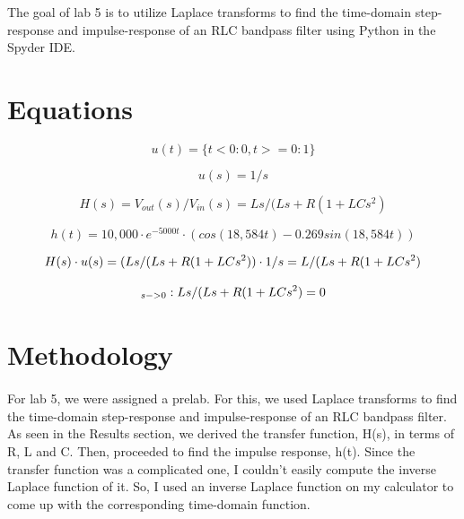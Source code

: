 \documentclass[12pt]{report}
\begin{document}
The goal of lab 5 is to utilize Laplace transforms to find the time-domain step-response and impulse-response of an RLC bandpass
filter using Python in the Spyder IDE.

\section{Equations}
    \begin{equation*}
        u(t) = \{t<0:0, t>=0:1\}
    \end{equation*}
 
    \begin{equation*}
        u(s) = 1/s
    \end{equation*}
 
    \begin{equation*}
        H(s) = V_{out}(s)/V_{in}(s) = Ls/(Ls + R(1 + LCs^2)
    \end{equation*}
    
     \begin{equation*}
        h(t) = 10,000 \cdot e^{-5000t} \cdot ( cos(18,584t) - 0.269sin(18,584t) )
    \end{equation*}
    
    \begin{equation*}
        H(s) \cdot u(s) = ( Ls/(Ls + R(1 + LCs^2) ) \cdot 1/s \\
                        = L/(Ls + R(1 + LCs^2)
    \end{equation*}

    \begin{equation*}
       [ H(s) \cdot u(s) ]_{s -> 0}: Ls/(Ls + R(1 + LCs^2) \\
                                = 0
    \end{equation*}
    
\section{Methodology}


    \paragraph{} For lab 5, we were assigned a prelab. For this, we used Laplace transforms to find the time-domain step-response and impulse-response of an RLC bandpass filter. As seen in the Results section, we derived the transfer function, H(s), in terms of R, L and C. Then, proceeded to find the impulse response, h(t). Since the transfer function was a complicated one, I couldn't easily compute the inverse Laplace function of it. So, I used an inverse Laplace function on my calculator to come up with the corresponding time-domain function. 
    
\end{document}
